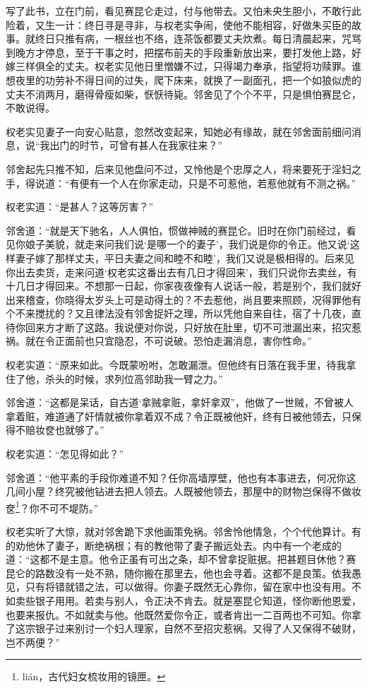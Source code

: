 \documentclass[a4paper,12pt,UTF8,twoside]{ctexbook}
\begin{document}
写了此书，立在门前，看见赛昆仑走过，付与他带去。又怕未央生胆小，不敢行此险着，又生一计：终日寻是寻非，与权老实争闹，使他不能相容，好做朱买臣的故事。就终日只推有病，一根丝也不络，连茶饭都要丈夫炊煮。每日清晨起来，咒骂到晚方才停息，至于干事之时，把摆布前夫的手段重新放出来，要打发他上路，好嫁三样俱全的丈夫。权老实见他日里憎嫌不过，只得竭力奉承，指望将功赎罪。谁想夜里的功劳补不得日间的过失，爬下床来，就换了一副面孔，把一个如狼似虎的丈夫不消两月，磨得骨瘦如柴，恹恹待毙。邻舍见了个个不平，只是惧怕赛昆仑，不敢说得。

权老实见妻子一向安心贴意，忽然改变起来，知她必有缘故，就在邻舍面前细问消息，说“我出门的时节，可曾有甚人在我家往来？”

邻舍起先只推不知，后来见他盘问不过，又怜他是个忠厚之人，将来要死于淫妇之手，得说道：“有便有一个人在你家走动，只是不可惹他，若惹他就有不测之祸。”

权老实道：“是甚人？这等厉害？”

邻舍道：“就是天下驰名，人人俱怕，惯做神贼的赛昆仑。旧时在你门前经过，看见你娘子美貌，就走来问我们说‘是哪一个的妻子’，我们说是你的令正。他又说‘这样妻子嫁了那样丈夫，平日夫妻之间和睦不和睦’，我们又说是极相得的。后来见你出去卖货，走来问道‘权老实这番出去有几日才得回来’，我们只说你去卖丝，有十几日才得回来。不想那一日起，你家夜夜像有人说话一般，若是别个，我们就好出来稽查，你晓得太岁头上可是动得土的？不去惹他，尚且要来照顾，况得罪他有个不来搅扰的？又且律法没有邻舍捉奸之理，所以凭他自来自往，宿了十几夜，直待你回来方才断了这路。我说便对你说，只好放在肚里，切不可泄漏出来，招灾惹祸。就在令正面前也只宜隐忍，不可说破。恐怕走漏消息，害你性命。”

权老实道：“原来如此。今既蒙吩咐，怎敢漏泄。但他终有日落在我手里，待我拿住了他，杀头的时候，求列位高邻助我一臂之力。”

邻舍道：“这都是呆话，自古道‘拿贼拿赃，拿奸拿双”，他做了一世贼，不曾被人拿着赃，难道通了奸情就被你拿着双不成？令正既被他奸，终有日被他领去，只保得不赔妆奁也就够了。”

权老实道：“怎见得如此？”

邻舍道：“他平素的手段你难道不知？任你高墙厚壁，他也有本事进去，何况你这几间小屋？终究被他钻进去把人领去。人既被他领去，那屋中的财物岂保得不做妆奁\footnote{li\'an，古代妇女梳妆用的镜匣。}？你不可不堤防。”

权老实听了大惊，就对邻舍跪下求他画策免祸。邻舍怜他情急，个个代他算计。有的劝他休了妻子，断绝祸根；有的教他带了妻子搬远处去。内中有一个老成的道：“这都不是主意。他令正虽有可出之条，却不曾拿捉赃据。把甚题目休他？赛昆仑的路数没有一处不熟，随你搬在那里去，他也会寻着。这都不是良策。依我愚见，只有将错就错之法，可以做得。你妻子既然无心靠你，留在家中也没有用。不如卖些银子用用。若卖与别人，令正决不肯去。就是塞昆仑知道，怪你断他恩爱，也要来报仇。不如就卖与他。他既然爱你令正，或者肯出一二百两也不可知。你拿了这宗银子过来别讨一个妇人理家，自然不至招灾惹祸。又得了人又保得不破财，岂不两便？”
\end{document}
